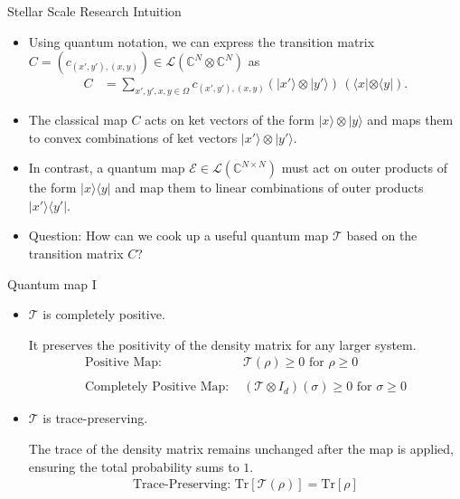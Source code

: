 \documentclass{beamer}
\renewcommand{\>}{\rangle}
\newcommand{\<}{\langle}
\newcommand{\C}{\mathbb{C}}
\newcommand{\cE}{\mathcal{E}}
\newcommand{\cT}{\mathcal{T}}
\newcommand{\cL}{\mathcal{L}}
\begin{document}
\begin{frame}{Stellar Scale Research Intuition}
\begin{itemize}
    \item Using quantum notation, we can express the transition matrix $C=(c_{(x',y'),(x,y)})\in\cL(\C^N \otimes \C^N)$ as
    \begin{align*}
        C 
        &=
        \sum_{x',y',x,y\in\Omega} c_{(x',y'),(x,y)} 
        (|x'\> \otimes |y'\>)\,(\<x| \otimes \<y|). 
    \end{align*}

    \medskip
    \item The classical map $C$ acts on ket vectors of the form $|x\> \otimes |y\>$ and maps them to convex combinations of ket vectors $|x'\> \otimes |y'\>$.

    \medskip
    \item In contrast, a quantum map $\cE\in\cL(\C^{N\times N})$ must act on outer products of the form $|x\>\<y|$ and map them to linear combinations of outer products $|x'\>\<y'|$.

    \medskip
    \item Question: How can we cook up a useful quantum map $\cT$ based on the transition matrix $C$?
\end{itemize}
    
\end{frame}


\iffalse

\begin{frame}{Quantum map I}

\begin{itemize}
    \item $\cT$ is completely positive. 

    \medskip
    It preserves the positivity of the density matrix for any larger system.
    \begin{align*}
        \text{Positive Map: } & \cT(\rho) \geq 0 \text{ for } \rho \geq 0 \\
        & \\
        \text{Completely Positive Map: } & (\cT \otimes I_d)(\sigma) \geq 0 \text{ for } \sigma \ge 0
    \end{align*}

    \bigskip
    \item $\cT$ is trace-preserving. 

    \medskip
    The trace of the density matrix remains unchanged after the map is applied, ensuring the total probability sums to $1$.
    \begin{align*}
        \text{Trace-Preserving: } \text{Tr}[\cT(\rho)] = \text{Tr}[\rho]
    \end{align*}

\end{itemize}

\end{frame}
\end{document}
